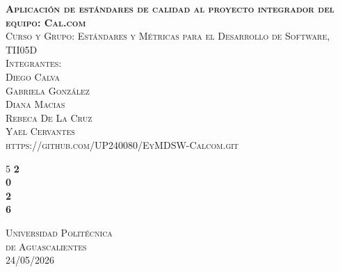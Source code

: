\documentclass{article}
\begin{document}
\setlength{\parindent}{0pt}
\begin{titlepage}
    \thispagestyle{empty}
{\huge \textsc{\textbf{Aplicación de estándares de calidad
al proyecto integrador del equipo: Cal.com}}}\\ [10pt]
    {\Large \textsc{Curso y Grupo: Estándares y Métricas para el Desarrollo de Software, TII05D}}\\[5pt]
    {\Large \textsc{Integrantes:\\Diego Calva \\ Gabriela González\\ Diana Macias\\ Rebeca De La Cruz\\ Yael Cervantes \\https://github.com/UP240080/EyMDSW-Calcom.git}} \\ [5pt]
    \begin{minipage}{3 cm}
    \hspace{0.5 cm} 
    \end{minipage} \hfill
    \begin{minipage}{4 cm}
        \begin{spacing}{5}
        {\color{white} \fontsize{60}{70} \selectfont \bfseries 2\\ 0\\ 2\\ 6}
        \end{spacing}
    \end{minipage}
    \vfill
    \begin{flushleft}
      \color{white} { {\Large \textsc{Universidad Politécnica\\ de Aguascalientes}} \\ [10pt]
        {\Large \textsc{24/05/2026}}
        }
    \end{flushleft}
\end{titlepage}

\begin{titlepage}
  \Large{\tableofcontents}
\end{titlepage}
\end{document}
